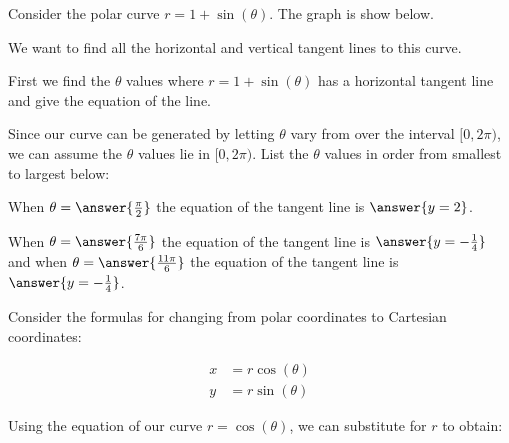 \documentclass{ximera}
\author{Jason Miller}
\begin{document}
\begin{exercise}


Consider the polar curve $r=1+\sin(\theta)$. The graph is show below. 




\begin{image}  
\end{image} 

We want to find all the horizontal and vertical tangent lines to this curve.

First we find the $\theta$ values where $r=1+\sin(\theta)$ has a horizontal tangent line and give the equation of the line. 

Since our curve can be generated by letting $\theta$ vary from over the interval $[0, 2\pi)$, we can assume the $\theta$ values lie in $[0, 2\pi)$. List the $\theta$ values in order from smallest to largest below: 


When $\theta=\answer{\frac{\pi}{2}}$ the equation of the tangent line is $\answer{y=2  }$.

When $\theta=\answer{\frac{7\pi}{6}}$ the equation of the tangent line is $\answer{y=-\frac{1}{4}}$ and when $\theta=\answer{ \frac{11\pi}{6}}$ the equation of 
the tangent line is $\answer{ y=-\frac{1}{4}}$. 




\begin{hint}

Consider the formulas for changing from polar coordinates to Cartesian coordinates:

\begin{align*}
x&=r\cos(\theta) \\
y&=r\sin(\theta)
\end{align*}

Using the equation of our curve $r=\cos(\theta)$, we can substitute for $r$ to obtain:


\end{hint}
\end{exercise}
\end{document}
